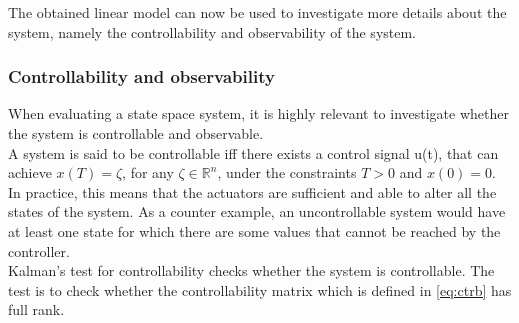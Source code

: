 %
%

The obtained linear model can now be used to investigate more details about the system, namely the controllability and observability of the system.

\subsubsection{Controllability and observability}
When evaluating a state space system, it is highly relevant to investigate whether the system is controllable and observable. \\
A system is said to be controllable iff there exists a control signal u(t), that can achieve $x(T) = \zeta$, for any $\zeta \in \mathbb{R} ^{n}$, under the constraints $T>0$ and $x(0)=0$. In practice, this means that the actuators are sufficient and able to alter all the states of the system. As a counter example, an uncontrollable system would have at least one state for which there are some values that cannot be reached by the controller.\\
Kalman's test for controllability checks whether the system is controllable. The test is to check whether the controllability matrix which is defined in \cref{eq:ctrb} has full rank.

